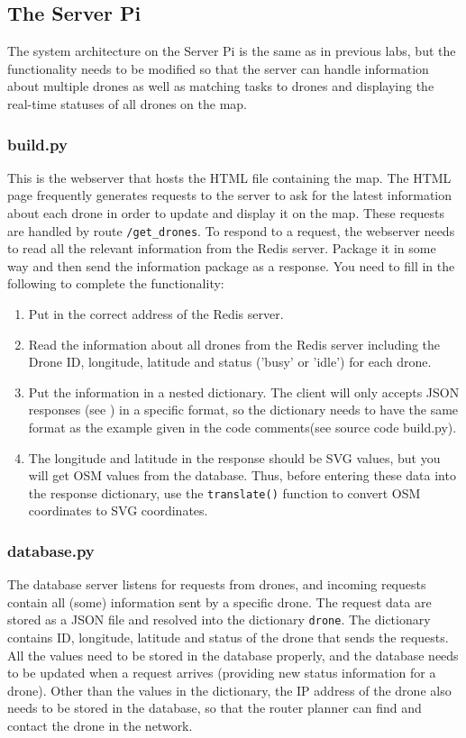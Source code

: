 \documentclass{article}
\begin{document}
\subsection{The Server Pi}
The system architecture on the Server Pi is the same as in previous labs, but the functionality needs to be modified so that the server can handle information about multiple drones as well as matching tasks to drones and displaying the real-time statuses of all drones on the map.

\subsubsection{build.py}
This is the webserver that hosts the HTML file containing the map. The HTML page frequently generates requests to the server to ask for the latest information about each drone in order to update and display it on the map. These requests are handled by route \verb!/get_drones!. To respond to a request, the webserver needs to read all the relevant information from the Redis server. Package it in some way and then send the information package as a response. You need to fill in the following to complete the functionality:
\begin{enumerate}
    \item Put in the correct address of the Redis server.
    \item Read the information about all drones from the Redis server including the Drone ID, longitude, latitude and status ('busy' or 'idle') for each drone.
    \item Put the information in a nested dictionary. The client will only accepts JSON responses (see \cite{json}) in a specific format, so the dictionary needs to have the same format as the example given in the code comments(see source code build.py).
    \item The longitude and latitude in the response should be SVG values, but you will get OSM values from the database. Thus, before entering these data into the response dictionary, use the \verb!translate()! function to convert OSM coordinates to SVG coordinates.
\end{enumerate}

\subsubsection{database.py}
The database server listens for requests from drones, and incoming requests contain all (some) information sent by a specific drone. The request data are stored as a JSON file and resolved into the dictionary \verb!drone!. The dictionary contains ID, longitude, latitude and status of the drone that sends the requests. All the values need to be stored in the database properly, and the database needs to be updated when a request arrives (providing new status information for a drone). Other than the values in the dictionary, the IP address of the drone also needs to be stored in the database, so that the router planner can find and contact the drone in the network.
\end{document}
